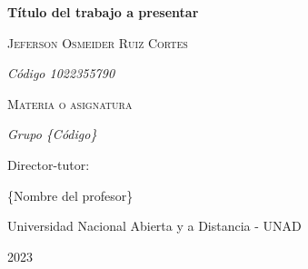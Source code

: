 \begin{titlepage}
	\centering
	{\bfseries\LARGE Título del trabajo a presentar\par}
	\vspace{3cm}
	{\scshape\LARGE Jeferson Osmeider Ruiz Cortes \par}
	{\itshape\Large C\'odigo 1022355790 \par}
	\vspace{2cm}
	{\scshape\Large Materia o asignatura \par}
	{\itshape\Large Grupo \{Código\} \par}
	\vspace{3cm}
	{\Large Director-tutor: \par}
	{\Large \{Nombre del profesor\}  \par}
	\vspace{2cm}
	{\Large Universidad Nacional Abierta y a Distancia - UNAD \par}
	{\Large 2023 \par}
\end{titlepage}